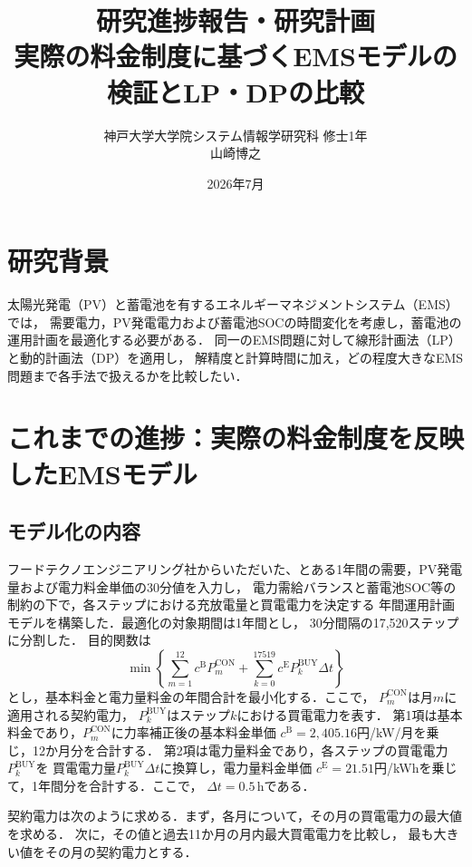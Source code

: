 \documentclass[a4paper,11pt,dvipdfmx]{jsarticle}
\title{研究進捗報告・研究計画\\[0.5em]\large 実際の料金制度に基づくEMSモデルの検証とLP・DPの比較}
\author{神戸大学大学院システム情報学研究科 修士1年\\山崎博之}
\date{2026年7月}
\begin{document}
\maketitle

\section{研究背景}

太陽光発電（PV）と蓄電池を有するエネルギーマネジメントシステム（EMS）では，
需要電力，PV発電電力および蓄電池SOCの時間変化を考慮し，蓄電池の運用計画を最適化する必要がある．
同一のEMS問題に対して線形計画法（LP）と動的計画法（DP）を適用し，
解精度と計算時間に加え，どの程度大きなEMS問題まで各手法で扱えるかを比較したい．

\section{これまでの進捗：実際の料金制度を反映したEMSモデル}

\subsection{モデル化の内容}

フードテクノエンジニアリング社からいただいた、とある1年間の需要，PV発電量および電力料金単価の30分値を入力し，
電力需給バランスと蓄電池SOC等の制約の下で，各ステップにおける充放電量と買電電力を決定する
年間運用計画モデルを構築した．最適化の対象期間は1年間とし，
30分間隔の17,520ステップに分割した．
目的関数は
\begin{equation}
  \min\left\{
  \sum_{m=1}^{12}c^{\mathrm{B}}P_m^{\mathrm{CON}}
  +\sum_{k=0}^{17519}c^{\mathrm{E}}P_k^{\mathrm{BUY}}\Delta t
  \right\}
  \label{eq:objective}
\end{equation}
とし，基本料金と電力量料金の年間合計を最小化する．ここで，
$P_m^{\mathrm{CON}}$は月$m$に適用される契約電力，
$P_k^{\mathrm{BUY}}$はステップ$k$における買電電力を表す．
第1項は基本料金であり，$P_m^{\mathrm{CON}}$に力率補正後の基本料金単価
$c^{\mathrm{B}}=2{,}405.16$円/kW/月を乗じ，12か月分を合計する．
第2項は電力量料金であり，各ステップの買電電力$P_k^{\mathrm{BUY}}$を
買電電力量$P_k^{\mathrm{BUY}}\Delta t$に換算し，電力量料金単価
$c^{\mathrm{E}}=21.51$円/kWhを乗じて，1年間分を合計する．ここで，
$\Delta t=0.5$\,hである．

契約電力は次のように求める．まず，各月について，その月の買電電力の最大値を求める．
次に，その値と過去11か月の月内最大買電電力を比較し，
最も大きい値をその月の契約電力とする．
\end{document}
